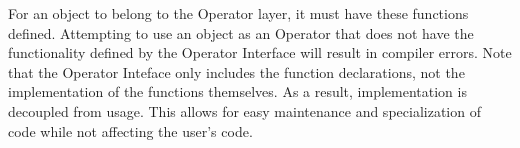 For an object to belong to the Operator layer, it must have these functions defined.
Attempting to use an object as an Operator that does not have the functionality defined by the Operator Interface will result in compiler errors.
Note that the Operator Inteface only includes the function declarations, not the implementation of the functions themselves.
As a result, implementation is decoupled from usage.
This allows for easy maintenance and specialization of code while not affecting the user's code.

